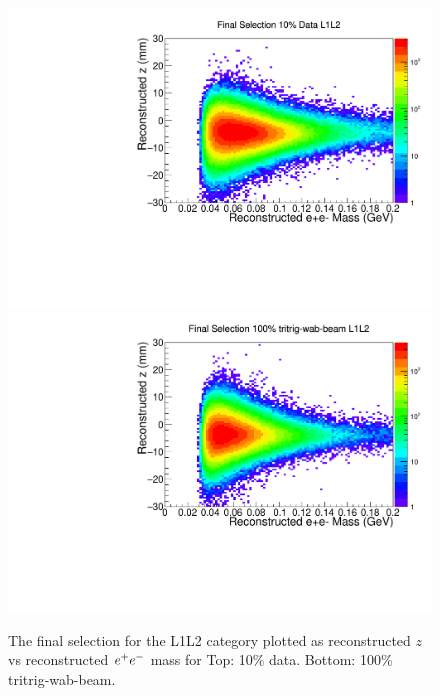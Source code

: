 \begin{figure}[!ht] 
    \centering
    \includegraphics[width=.85\textwidth]{figs/selection/data_L1L2_final_vz_mass.pdf}
    \includegraphics[width=.85\textwidth]{figs/selection/mc_L1L2_final_vz_mass.pdf}
    \caption{
        The final selection for the L1L2 category plotted as reconstructed $z$ vs reconstructed $e^{+}e^{-}$ mass for Top: 10\% data. Bottom: 100\% tritrig-wab-beam.
    }
    \label{fig:singleV0_2D_L1L2}
\end{figure}  

\clearpage


